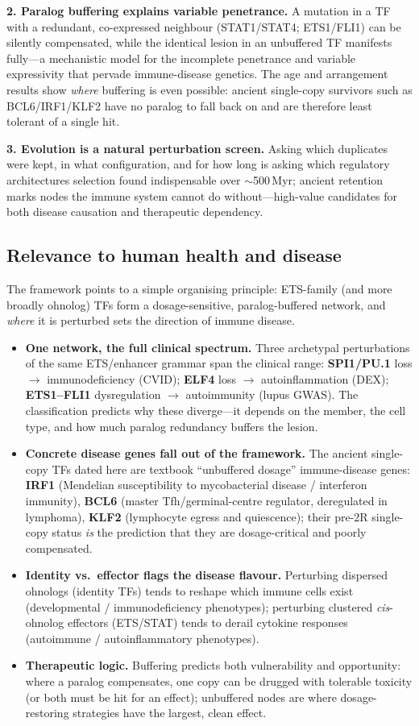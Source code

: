 \documentclass[11pt]{article}
\begin{document}
\textbf{2. Paralog buffering explains variable penetrance.} A mutation in a TF with a
redundant, co-expressed neighbour (STAT1/STAT4; ETS1/FLI1) can be silently compensated, while
the identical lesion in an unbuffered TF manifests fully---a mechanistic model for the
incomplete penetrance and variable expressivity that pervade immune-disease genetics. The age
and arrangement results show \emph{where} buffering is even possible: ancient single-copy
survivors such as BCL6/IRF1/KLF2 have no paralog to fall back on and are therefore least
tolerant of a single hit.

\textbf{3. Evolution is a natural perturbation screen.} Asking which duplicates were kept, in
what configuration, and for how long is asking which regulatory architectures selection found
indispensable over $\sim$500\,Myr; ancient retention marks nodes the immune system cannot do
without---high-value candidates for both disease causation and therapeutic dependency.

\subsection{Relevance to human health and disease}
The framework points to a simple organising principle: ETS-family (and more broadly ohnolog)
TFs form a dosage-sensitive, paralog-buffered network, and \emph{where} it is perturbed sets
the direction of immune disease.
\begin{itemize}[leftmargin=1.4em,itemsep=2pt]
\item \textbf{One network, the full clinical spectrum.} Three archetypal perturbations of the
same ETS/enhancer grammar span the clinical range: \textbf{SPI1/PU.1} loss
$\rightarrow$ immunodeficiency (CVID); \textbf{ELF4} loss $\rightarrow$ autoinflammation
(DEX); \textbf{ETS1--FLI1} dysregulation $\rightarrow$ autoimmunity (lupus GWAS). The
classification predicts why these diverge---it depends on the member, the cell type, and how
much paralog redundancy buffers the lesion.
\item \textbf{Concrete disease genes fall out of the framework.} The ancient single-copy TFs
dated here are textbook ``unbuffered dosage'' immune-disease genes: \textbf{IRF1} (Mendelian
susceptibility to mycobacterial disease / interferon immunity), \textbf{BCL6} (master
Tfh/germinal-centre regulator, deregulated in lymphoma), \textbf{KLF2} (lymphocyte egress and
quiescence); their pre-2R single-copy status \emph{is} the prediction that they are
dosage-critical and poorly compensated.
\item \textbf{Identity vs.\ effector flags the disease flavour.} Perturbing dispersed ohnologs
(identity TFs) tends to reshape which immune cells exist (developmental / immunodeficiency
phenotypes); perturbing clustered \emph{cis}-ohnolog effectors (ETS/STAT) tends to derail
cytokine responses (autoimmune / autoinflammatory phenotypes).
\item \textbf{Therapeutic logic.} Buffering predicts both vulnerability and opportunity: where
a paralog compensates, one copy can be drugged with tolerable toxicity (or both must be hit
for an effect); unbuffered nodes are where dosage-restoring strategies have the largest, clean
effect.
\end{itemize}
\end{document}
